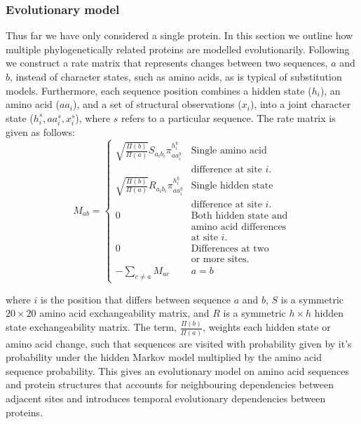 \documentclass[nogrid]{MBE}%
\begin{document}
\subsubsection{Evolutionary model}
Thus far we have only considered a single protein. In this section we outline how multiple phylogenetically related proteins are modelled evolutionarily. Following \citet{choi2008basing} we construct a rate matrix that represents changes between two sequences, $a$ and $b$, instead of character states, such as amino acids, as is typical of substitution models. Furthermore, each sequence position combines a hidden state ($h_i$), an amino acid ($aa_i$), and a set of structural observations ($x_i$), into a joint character state ($h^{s}_i,aa^{s}_i,x^{s}_i$), where $s$ refers to a particular sequence. The rate matrix is given as follows:
\begin{equation}
\label{eq:ratematrix}
M_{ab}=\begin{cases}

\sqrt{\frac{\Pi(b)}{\Pi(a)}}S_{a_{i}b_{i}}\pi^{h^{b}_{i}}_{aa^{b}_{i}} & \text{Single amino acid}\\
& \text{difference at site $i$.}\\ 

\sqrt{\frac{\Pi(b)}{\Pi(a)}}R_{a_{i}b_{i}}\pi^{h^{b}_{i}}_{aa^{b}_{i}} & \text{Single hidden state}\\
& \text{difference at site $i$.}\\ 

0 & \text{Both hidden state and}\\
& \text{amino acid differences}\\
& \text{at site $i$.}\\ 

0 & \text{Differences at two}\\
& \text{or more sites.}\\

-\underset{c\neq a}{\sum}M_{ac} & a=b
\end{cases}
\end{equation}

where $i$ is the position that differs between sequence $a$ and $b$, $S$ is a symmetric $20\times{20}$ amino acid exchangeability matrix, and $R$ is a symmetric $h\times{h}$ hidden state exchangeability matrix. The term, $\frac{\Pi(b)}{\Pi(a)}$, weights each hidden state or amino acid change, such that sequences are visited with probability given by it's probability under the hidden Markov model multiplied by the amino acid sequence probability. This gives an evolutionary model on amino acid sequences and protein structures that accounts for neighbouring dependencies between adjacent sites and introduces temporal evolutionary dependencies between proteins.
\end{document}
